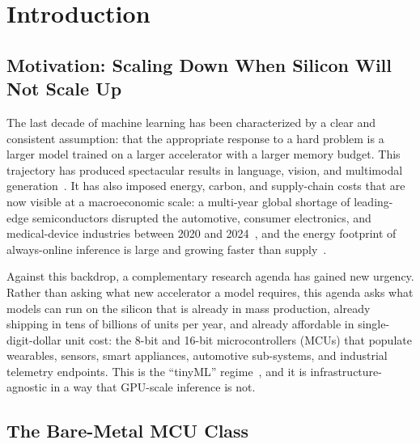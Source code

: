 \section{Introduction}
\label{sec:intro}

\subsection{Motivation: Scaling Down When Silicon Will Not Scale Up}

The last decade of machine learning has been characterized by a
clear and consistent assumption: that the appropriate response to a
hard problem is a larger model trained on a larger accelerator with
a larger memory budget. This trajectory has produced spectacular
results in language, vision, and multimodal
generation~\cite{patterson2021carbon}. It has also imposed energy,
carbon, and supply-chain costs that are now visible at a
macroeconomic scale: a multi-year global shortage of leading-edge
semiconductors disrupted the automotive, consumer electronics, and
medical-device industries between 2020 and
2024~\cite{burkacky2022chipshortage,khan2021chipshortage}, and the
energy footprint of always-online inference is large and growing
faster than supply~\cite{strubell2019energy,patterson2021carbon}.

Against this backdrop, a complementary research agenda has gained
new urgency. Rather than asking what new accelerator a model
requires, this agenda asks what models can run on the silicon that
is already in mass production, already shipping in tens of billions
of units per year, and already affordable in single-digit-dollar
unit cost: the 8-bit and 16-bit microcontrollers (MCUs) that
populate wearables, sensors, smart appliances, automotive
sub-systems, and industrial telemetry endpoints. This is the
``tinyML'' regime~\cite{banbury2021mlperf}, and it is
infrastructure-agnostic in a way that GPU-scale inference is not.

\subsection{The Bare-Metal MCU Class}

